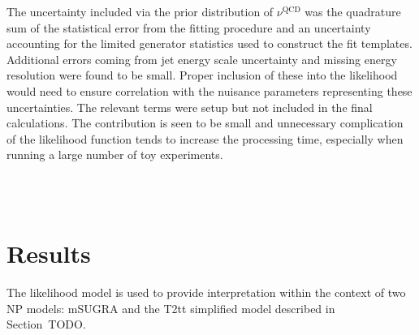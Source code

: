 The uncertainty included via the prior distribution of $\nu^{\textrm{QCD}}$ was
the quadrature sum of the statistical error from the fitting procedure and an
uncertainty accounting for the limited generator statistics used to construct
the fit templates. Additional errors coming from jet energy scale uncertainty
and missing energy resolution were found to be small. Proper inclusion of these
into the likelihood would need to ensure correlation with the nuisance
parameters representing these uncertainties. The relevant terms were setup but
not included in the final calculations. The contribution is seen to be small and
unnecessary complication of the likelihood function tends to increase the
processing time, especially when running a large number of toy experiments.

\begin{figure}
\centering
{}\quad
{}
\caption[]{}
\label{fig:inter_pl}
\end{figure}

\begin{figure}
\centering
{}\quad
{}\\
\quad
{}\\
\caption[]{}
\label{fig:inter_cls}
\end{figure}

\section{Results}
The likelihood model is used to provide interpretation within the context of two
\ac{NP} models: \ac{mSUGRA} and the \ac{T2tt} simplified model described in
Section~TODO.

